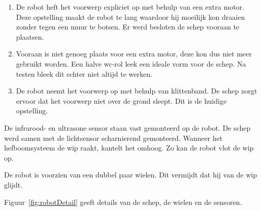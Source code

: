\documentclass[tt2]{penoverslag}
\begin{document}
\begin{enumerate}
\item De robot heft het voorwerp expliciet op met behulp van een extra motor. Deze opstelling maakt de robot te lang waardoor hij moeilijk kon draaien zonder tegen een muur te botsen. Er werd besloten de schep vooraan te plaatsen.
\item Vooraan is niet genoeg plaats voor een extra motor, deze kon dus niet meer gebruikt worden. Een halve wc-rol leek een ideale vorm voor de schep. Na testen bleek dit echter niet altijd te werken.
\item De robot neemt het voorwerp op met behulp van klittenband. De schep zorgt ervoor dat het voorwerp niet over de grond sleept. Dit is de huidige opstelling.
\end{enumerate}

De infrarood- en ultrasone sensor staan vast gemonteerd op de robot. De schep werd samen met de lichtsensor scharnierend gemonteerd. Wanneer het hefboomsysteem de wip raakt, kantelt het omhoog. Zo kan de robot vlot de wip op.

De robot is voorzien van een dubbel paar wielen. Dit vermijdt dat hij van de wip glijdt.

Figuur~\ref{fig:robotDetail} geeft details van de schep, de wielen en de sensoren.
\end{document}
